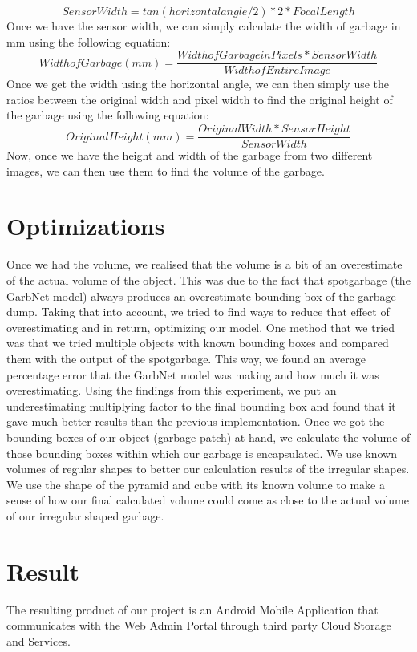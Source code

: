 \begin{equation}
    Sensor Width = tan(horizontal angle/2) * 2 * Focal Length   
\end{equation}
Once we have the sensor width, we can simply calculate the width of garbage in mm using the following equation:
\begin{equation}
    Width of Garbage (mm) = \frac{Width of Garbage in Pixels * Sensor Width}{Width of Entire Image}
\end{equation}
Once we get the width using the horizontal angle, we can then simply use the ratios between the original width and pixel width to find the original height of the garbage using the following equation:
\begin{equation}
    Original Height (mm) = \frac{Original Width * Sensor Height}{Sensor Width}
\end{equation}
Now, once we have the height and width of the garbage from two different images, we can then use them to find the volume of the garbage.
\section{Optimizations}
Once we had the volume, we realised that the volume is a bit of an overestimate of the actual volume of the object. This was due to the fact that spotgarbage (the GarbNet model) always produces an overestimate bounding box of the garbage dump. Taking that into account, we tried to find ways to reduce that effect of overestimating and in return, optimizing our model. One method that we tried was that we tried multiple objects with known bounding boxes and compared them with the output of the spotgarbage. This way, we found an average percentage error that the GarbNet model was making and how much it was overestimating. Using the findings from this experiment, we put an underestimating multiplying factor to the final bounding box and found that it gave much better results than the previous implementation. Once we got the bounding boxes of our object (garbage patch) at hand, we calculate the volume of those bounding boxes within which our garbage is encapsulated. We use known volumes of regular shapes to better our calculation results of the irregular shapes. We use the shape of the pyramid and cube with its known volume to make a sense of how  our final calculated volume could come as close to the actual volume of our irregular shaped garbage.
\section{Result}
The resulting product of our project is an Android Mobile Application that communicates with the Web Admin Portal through third party Cloud Storage and Services.
